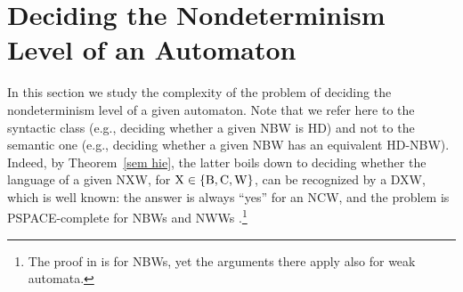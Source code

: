 \documentclass[10pt,a4paper]{amsart}
\theoremstyle{definition}
\numberwithin{equation}{section}
\newcommand{\dxw}{DXW\xspace}
\newcommand{\nxw}{NXW\xspace}
\begin{document}
\section{Deciding the Nondeterminism Level of an Automaton}

In this section we study the complexity of the problem of deciding the nondeterminism level of a given automaton. Note that we refer here to the syntactic class (e.g., deciding whether a given NBW is HD) and not to the semantic one (e.g., deciding whether a given NBW has an equivalent HD-NBW). Indeed, by Theorem~\ref{sem hie}, the latter boils down to deciding whether the language of a given \nxw, for ${\rm X} \in \{{\rm B,C,W}\}$, can be recognized by a \dxw, which is well known: the answer is always ``yes'' for an NCW, and the problem is PSPACE-complete for NBWs  and NWWs \cite{KV05b}.\footnote{The proof in \cite{KV05b} is for NBWs, yet the arguments there apply also for weak automata.}
 
\end{document}
